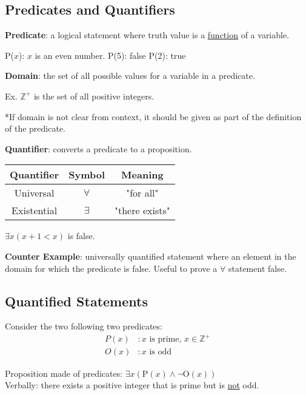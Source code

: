 \subsection{Predicates and Quantifiers}

\textbf{Predicate}: a logical statement where truth value is a \underline{function} of a variable.

\begin{center}
  P(\(x\)): \(x\) is an even number. \qquad P(5): false \qquad P(2): true
\end{center}

\noindent \textbf{Domain}: the set of all possible values for a variable in a predicate.

\begin{center}
  Ex. \( \mathbb{Z}^+ \) is the set of all positive integers.

  *If domain is not clear from context, it should be given as part of the definition of the predicate.
\end{center}

\noindent \textbf{Quantifier}: converts a predicate to a proposition.
\qquad
\begin{tabular}{c|c|c}
  Quantifier  & Symbol       & Meaning        \\
  \hline
  Universal   & \(\forall \) & "for all"      \\
  Existential & \(\exists\)  & "there exists" \\
\end{tabular}

\begin{center}
  \(\exists x (x+1 < x)\) is false.
\end{center}

\noindent \textbf{Counter Example}: universally quantified statement where an element in the domain
for which the predicate is false. Useful to prove a \(\forall\) statement false.

\subsection{Quantified Statements}

Consider the two following two predicates:
\begin{align*}
  P(x) & : x \text{ is prime, } x \in \mathbb{Z}^+ \\
  O(x) & : x \text{ is odd}
\end{align*}

\begin{center}
  Proposition made of predicates: \qquad \(\exists x (\text{P}(x) \land \lnot \text{O}(x))\) \\
  Verbally: there exists a positive integer that is prime but is \underline{not} odd.
\end{center}

